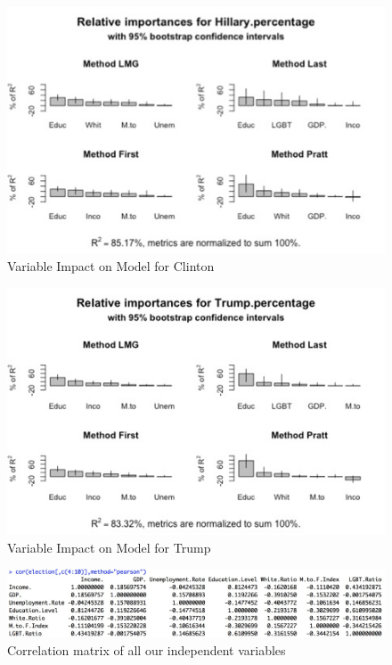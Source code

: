 \documentclass{article}
\begin{document}
{\begin{figure}[!htb]
  \centering
    \includegraphics[scale=0.7]{HillaryBootstrap}
  \caption{Variable Impact on Model for Clinton}
\end{figure}

\begin{figure}[!htb]
  \centering
    \includegraphics[scale=0.7]{TrumpBootstrap}
  \caption{Variable Impact on Model for Trump}
\end{figure}

\begin{figure}[!htb]
  \centering
    \includegraphics[scale=0.3]{CorrelationMatrix}
  \caption{Correlation matrix of all our independent variables}
\end{figure}

}
\end{document}
